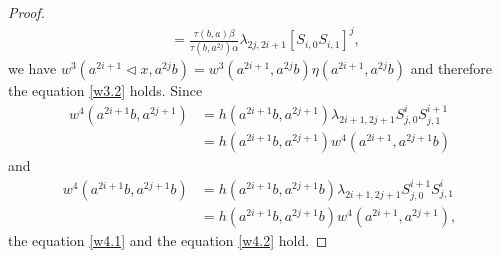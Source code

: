 \documentclass[a4paper,11pt]{amsart}
\numberwithin{equation}{section}
\begin{document}
\begin{proof}
\begin{align*}
&=\frac{\tau(b,a)\beta}{\tau(b,a^{2j})\alpha} \lambda_{2j,2i+1}[S_{i,0}S_{i,1}]^{j},
\end{align*}
we have $w^3(a^{2i+1}\triangleleft x,a^{2j}b)=w^3(a^{2i+1},a^{2j}b)\eta(a^{2i+1},a^{2j}b)$ and therefore the equation \eqref{w3.2} holds. Since
\begin{align*}
w^4(a^{2i+1}b,a^{2j+1})&=h(a^{2i+1}b,a^{2j+1})\lambda_{2i+1,2j+1}S_{j,0}^{i}S_{j,1}^{i+1}\\
&=h(a^{2i+1}b,a^{2j+1}) w^4(a^{2i+1},a^{2j+1}b)
\end{align*}
and
\begin{align*}
w^4(a^{2i+1}b,a^{2j+1}b)&=h(a^{2i+1}b,a^{2j+1}b)\lambda_{2i+1,2j+1}S_{j,0}^{i+1}S_{j,1}^{i}\\
&=h(a^{2i+1}b,a^{2j+1}b) w^4(a^{2i+1},a^{2j+1}),
\end{align*}
the equation \eqref{w4.1} and the equation \eqref{w4.2} hold.
\end{proof}
\end{document}
